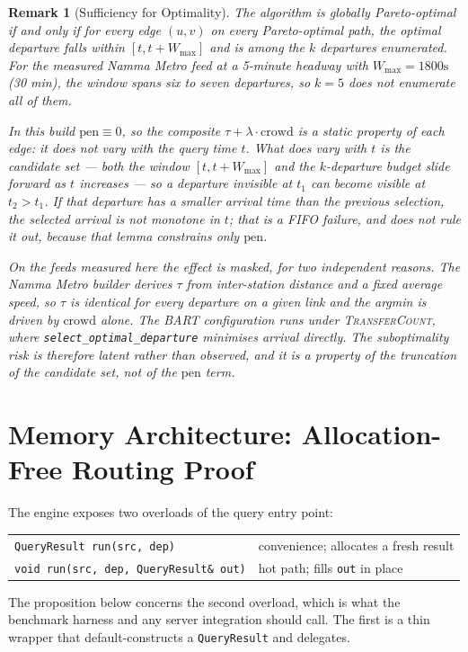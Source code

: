 \documentclass[11pt, a4paper]{article}
\newtheorem{remark}[theorem]{Remark}
\theoremstyle{remark}
\newcommand{\wmax}{W_{\max}}
\newcommand{\crowd}{\mathrm{crowd}}
\newcommand{\pen}{\mathrm{pen}}
\begin{document}
\begin{remark}[Sufficiency for Optimality]
    The algorithm is globally Pareto-optimal if and only if for every edge
    $(u,v)$ on every Pareto-optimal path, the optimal departure falls within
    $[t, t + W_{\max}]$ and is among the $k$ departures enumerated. For
    the measured Namma Metro feed at a 5-minute headway with
    $W_{\max} = 1800\text{s}$ (30 min), the window spans six to seven departures,
    so $k = 5$ does \emph{not} enumerate all of them.

    In this build $\pen \equiv 0$, so the composite $\tau + \lambda\cdot\crowd$ is a
    \emph{static property of each edge}: it does not vary with the query time $t$.
    What does vary with $t$ is the \emph{candidate set} --- both the window
    $[t, t + \wmax]$ and the $k$-departure budget slide forward as $t$ increases ---
    so a departure invisible at $t_1$ can become visible at $t_2 > t_1$. If that
    departure has a smaller arrival time than the previous selection, the selected
    arrival is not monotone in $t$; that is a FIFO failure, and
     does not rule it out, because that lemma constrains only
    $\pen$.

    On the feeds measured here the effect is masked, for two independent reasons.
    The Namma Metro builder derives $\tau$ from inter-station distance and a fixed
    average speed, so $\tau$ is identical for every departure on a given link and
    the argmin is driven by $\crowd$ alone. The BART configuration runs under
    \textsc{TransferCount}, where \texttt{select\_optimal\_departure} minimises
    arrival directly. The suboptimality risk is therefore latent rather than
    observed, and it is a property of the \emph{truncation} of the candidate set,
    not of the $\pen$ term.
\end{remark}

\section{Memory Architecture: Allocation-Free Routing Proof}

The engine exposes two overloads of the query entry point:
\begin{center}
\begin{tabular}{ll}
\texttt{QueryResult run(src, dep)} & convenience; allocates a fresh result \\
\texttt{void run(src, dep, QueryResult\& out)} & hot path; fills \texttt{out} in place \\
\end{tabular}
\end{center}
The proposition below concerns the second overload, which is what the benchmark
harness and any server integration should call. The first is a thin wrapper that
default-constructs a \texttt{QueryResult} and delegates.
\end{document}
